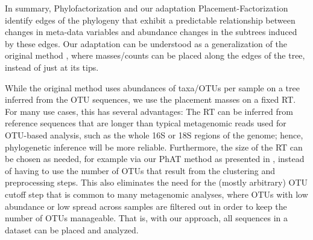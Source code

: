 In summary, Phylofactorization and our adaptation Placement-Factorization
identify edges of the phylogeny that exhibit a predictable relationship between changes in meta-data variables and
abundance changes in the subtrees induced by these edges.
Our adaptation can be understood as a generalization of the original method \cite{Washburne2017a,Washburne2019},
where masses/counts can be placed along the edges of the tree, instead of just at its tips.

While the original method uses abundances of taxa/OTUs per sample on a tree inferred from the OTU sequences,
we use the placement masses on a fixed \acf{RT}.
For many use cases, this has several advantages:
The \ac{RT} can be inferred from reference sequences that are longer
than typical metagenomic reads used for OTU-based analysis, such as the whole 16S or 18S regions of the genome;
hence, phylogenetic inference will be more reliable.
Furthermore, the size of the \ac{RT} can be chosen as needed,
for example via our \acf{PhAT} method as presented in ,
instead of having to use the number of OTUs that result from the clustering and preprocessing steps.
This also eliminates the need for the (mostly arbitrary) OTU cutoff step that is common to many metagenomic analyses,
where OTUs with low abundance or low spread across samples are filtered out in order to keep the number of OTUs manageable.
That is, with our approach, all sequences in a dataset can be placed and analyzed.

